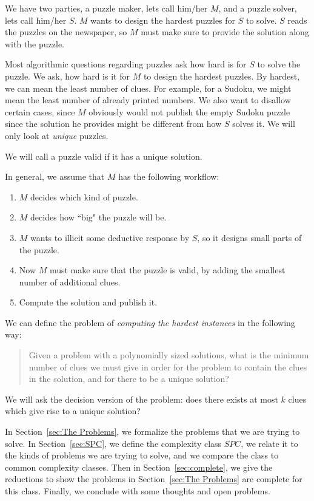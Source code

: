 \documentclass[runningheads,a4paper]{llncs}
\begin{document}
We have two parties, a puzzle maker, lets call him/her $M$, and a puzzle solver, lets call him/her $S$. $M$ wants to design the hardest puzzles for $S$ to solve. $S$ reads the puzzles on the newspaper, so $M$ must make sure to provide the solution along with the puzzle. 

Most algorithmic questions regarding puzzles ask how hard is for $S$ to solve the puzzle. We ask, how hard is it for $M$ to design the hardest puzzles. By hardest, we can mean the least number of clues. For example, for a Sudoku, we might mean the least number of already printed numbers. We also want to disallow certain cases, since $M$ obviously would not publish the empty Sudoku puzzle since the solution he provides might be different from how $S$ solves it. We will only look at \emph{unique} puzzles.

\begin{definition}
We will call a puzzle valid if it has a unique solution.
\end{definition}

In general, we assume that $M$ has the following workflow:
\begin{enumerate}
\item $M$ decides which kind of puzzle.
\item $M$ decides how ``big" the puzzle will be.
\item $M$ wants to illicit some deductive response by $S$, so it designs small parts of the puzzle.
\item Now $M$ must make sure that the puzzle is valid, by adding the smallest number of additional clues.
\item Compute the solution and publish it. 
\end{enumerate}

We can define the problem of \emph{computing the hardest instances} in the following way: 
\begin{quote}
Given a problem with a polynomially sized solutions, what is the minimum number of clues we must give in order for the problem to contain the clues in the solution, and for there to be a unique solution?
\end{quote}

We will ask the decision version of the problem: does there exists at most $k$ clues which give rise to a unique solution?

In Section~\ref{sec:The Problems}, we formalize the problems that we are trying to solve. In Section~\ref{sec:SPC}, we define the complexity class $SPC$, we relate it to the kinds of problems we are trying to solve, and we compare the class to common complexity classes. Then in Section~\ref{sec:complete}, we give the reductions to show the problems in Section~\ref{sec:The Problems} are complete for this class. Finally, we conclude with some thoughts and open problems.
\end{document}
